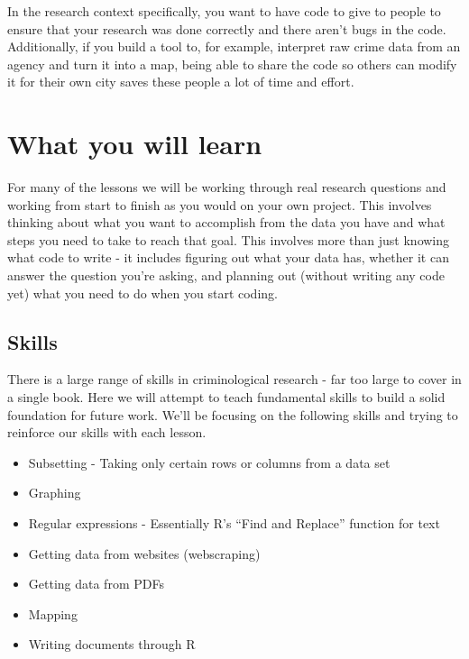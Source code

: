 \documentclass[
  12pt,
]{book}
\providecommand{\tightlist}{%
  \setlength{\itemsep}{0pt}\setlength{\parskip}{0pt}}
\begin{document}
In the research context specifically, you want to have code to give to people to ensure that your research was done correctly and there aren't bugs in the code. Additionally, if you build a tool to, for example, interpret raw crime data from an agency and turn it into a map, being able to share the code so others can modify it for their own city saves these people a lot of time and effort.

\hypertarget{what-you-will-learn}{%
\section*{What you will learn}\label{what-you-will-learn}}


For many of the lessons we will be working through real research questions and working from start to finish as you would on your own project. This involves thinking about what you want to accomplish from the data you have and what steps you need to take to reach that goal. This involves more than just knowing what code to write - it includes figuring out what your data has, whether it can answer the question you're asking, and planning out (without writing any code yet) what you need to do when you start coding.

\hypertarget{skills}{%
\subsection*{Skills}\label{skills}}


There is a large range of skills in criminological research - far too large to cover in a single book. Here we will attempt to teach fundamental skills to build a solid foundation for future work. We'll be focusing on the following skills and trying to reinforce our skills with each lesson.

\begin{itemize}
\tightlist
\item
  Subsetting - Taking only certain rows or columns from a data set
\item
  Graphing
\item
  Regular expressions - Essentially R's ``Find and Replace'' function for text
\item
  Getting data from websites (webscraping)
\item
  Getting data from PDFs
\item
  Mapping
\item
  Writing documents through R
\end{itemize}
\end{document}
